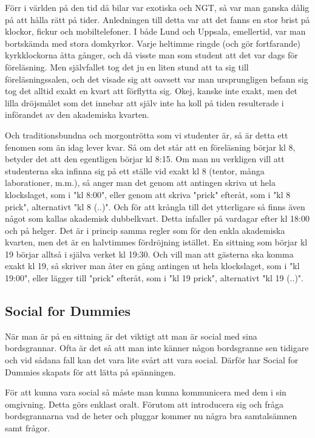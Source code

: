Förr i världen på den tid då bilar var exotiska och NGT, 
så var man ganska dålig på att hålla rätt på tider. 
Anledningen till detta var att det fanns en stor brist på klockor, fickur och mobiltelefoner. 
I både Lund och Uppsala, emellertid, var man bortskämda med stora domkyrkor. 
Varje heltimme ringde (och gör fortfarande) kyrkklockorna åtta gånger, 
och då visste man som student att det var dags för föreläsning. 
Men självfallet tog det ju en liten stund att ta sig till föreläsningssalen, 
och det visade sig att oavsett var man ursprungligen befann sig tog det alltid exakt en kvart att förflytta sig. 
Okej, kanske inte exakt, men det lilla dröjsmålet som det innebar att själv inte ha koll på tiden resulterade i införandet av den akademiska kvarten.

Och traditionsbundna och morgontrötta som vi studenter är, 
så är detta ett fenomen som än idag lever kvar. Så om det står att en föreläsning börjar kl 8, 
betyder det att den egentligen börjar kl 8:15. 
Om man nu verkligen vill att studenterna ska infinna sig på ett ställe vid exakt kl 8 
(tentor, många laborationer, m.m.), så anger man det genom att antingen skriva ut hela klockslaget, 
som i "kl 8:00", eller genom att skriva "prick" efteråt, som i "kl 8 prick", alternativt "kl 8 (..)". 
Och för att krångla till det ytterligare så finns även något som kallas akademisk dubbelkvart. 
Detta infaller på vardagar efter kl 18:00 och på helger. 
Det är i princip samma regler som för den enkla akademiska kvarten, 
men det är en halvtimmes fördröjning istället. 
En sittning som börjar kl 19 börjar alltså i själva verket kl 19:30. 
Och vill man att gästerna ska komma exakt kl 19, 
så skriver man åter en gång antingen ut hela klockslaget, 
som i "kl 19:00", eller lägger till "prick" efteråt, som i "kl 19 prick", alternativt "kl 19 (..)".
\newpage


\subsection*{Social for Dummies}
När man är på en sittning är det viktigt att man är social med sina bordsgrannar. 
Ofta är det så att man inte känner någon bordsgranne sen tidigare och vid sådana 
fall kan det vara lite svårt att vara social. Därför har Social for Dummies 
skapats för att lätta på spänningen.

För att kunna vara social så måste man kunna kommunicera med dem i sin omgivning. 
Detta görs enklast oralt. Förutom att introducera sig och fråga bordsgrannarna vad de 
heter och pluggar kommer nu några bra samtalsämnen samt frågor.

